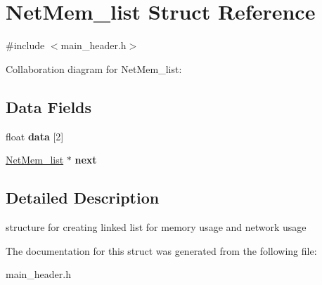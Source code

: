\hypertarget{struct_net_mem__list}{}\section{Net\+Mem\+\_\+list Struct Reference}
\label{struct_net_mem__list}


{\ttfamily \#include $<$main\+\_\+header.\+h$>$}



Collaboration diagram for Net\+Mem\+\_\+list\+:
\subsection*{Data Fields}
\begin{DoxyCompactItemize}
\item 
float {\bfseries data} \mbox{[}2\mbox{]}\hypertarget{struct_net_mem__list_ab1a8299eec1e97f9f98753da48fb622a}{}\label{struct_net_mem__list_ab1a8299eec1e97f9f98753da48fb622a}

\item 
\hyperlink{struct_net_mem__list}{Net\+Mem\+\_\+list} $\ast$ {\bfseries next}\hypertarget{struct_net_mem__list_afbcb2b2010576f8d228a30ff7d0245c7}{}\label{struct_net_mem__list_afbcb2b2010576f8d228a30ff7d0245c7}

\end{DoxyCompactItemize}


\subsection{Detailed Description}
structure for creating linked list for memory usage and network usage 

The documentation for this struct was generated from the following file\+:\begin{DoxyCompactItemize}
\item 
main\+\_\+header.\+h\end{DoxyCompactItemize}
